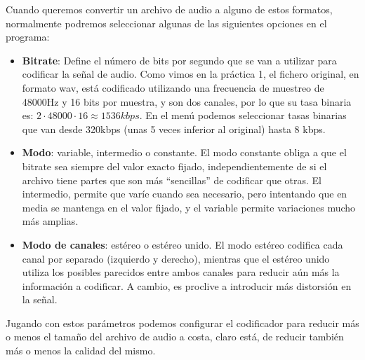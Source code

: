 \documentclass[es,practica]{uah}
\begin{document}
Cuando queremos convertir un archivo de audio a alguno de estos formatos, normalmente podremos seleccionar algunas de las siguientes opciones en el programa:

\begin{itemize}
\item {\bf Bitrate}: Define el número de bits por segundo que se van a utilizar para codificar la señal de audio. Como vimos en la práctica 1, el fichero original, en formato wav, está codificado utilizando una frecuencia de muestreo de 48000Hz y 16 bits por muestra, y son dos canales, por lo que su tasa binaria es: $2 \cdot 48000 \cdot 16 \approx 1536 kbps$. En el menú podemos seleccionar tasas binarias que van desde 320kbps (unas 5 veces inferior al original) hasta 8 kbps. 
\item {\bf Modo}: variable, intermedio o constante. El modo constante obliga a que el bitrate sea siempre del valor exacto fijado, independientemente de si el archivo tiene partes que son más ``sencillas'' de codificar que otras. El intermedio, permite que varíe cuando sea necesario, pero intentando que en media se mantenga en el valor fijado, y el variable permite variaciones mucho más amplias. 
\item {\bf Modo de canales}: estéreo o estéreo unido. El modo estéreo codifica cada canal por separado (izquierdo y derecho), mientras que el estéreo unido utiliza los posibles parecidos entre ambos canales para reducir aún más la información a codificar. A cambio, es proclive a introducir más distorsión en la señal.
\end{itemize}

Jugando con estos parámetros podemos configurar el codificador para reducir más o menos el tamaño del archivo de audio a costa, claro está, de reducir también más o menos la calidad del mismo. 
\end{document}
